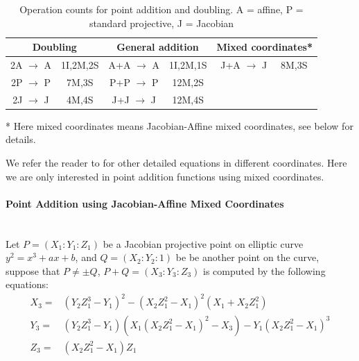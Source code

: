 \begin{table}[h]
	\centering
	\caption{Operation counts for point addition and doubling. A = affine, P = standard projective, J = Jacobian \cite{hankerson2006guide,brown2001software}}
	\label{tb:APJacobian}
	\begin{tabular}{|cc|cc|ll|}
		\hline
		\multicolumn{2}{|c|}{Doubling} & \multicolumn{2}{c|}{General addition} & \multicolumn{2}{c|}{Mixed coordinates*} \\ \hline
		2A $\rightarrow$ A         & 1I,2M,2S        & A+A $\rightarrow$ A            & 1I,2M,1S           & \multicolumn{1}{c}{J+A $\rightarrow$ J}    & 8M,3S   \\
		2P $\rightarrow$ P         & 7M,3S           & P+P $\rightarrow$ P            & 12M,2S             &                              &         \\
		2J $\rightarrow$ J         & 4M,4S           & J+J $\rightarrow$ J            & 12M,4S             &                              &         \\ \hline
	\end{tabular} \par
	\bigskip
	* Here mixed coordinates means Jacobian-Affine mixed coordinates, see below for details.
\end{table}

We refer the reader to \cite{hankerson2006guide,brown2001software} for other detailed equations in different coordinates. Here we are only interested in point addition functions using mixed coordinates. 

\paragraph{Point Addition using Jacobian-Affine Mixed Coordinates} \mbox{} \\
Let $P = (X_1:Y_1:Z_1)$ be a Jacobian projective point on elliptic curve $y^2=x^3+ax+b$, and $Q = (X_2:Y_2:1)$ be be another point on the curve, suppose that $P \neq \pm Q$, $P+Q=(X_3:Y_3:Z_3)$ is computed by the following equations:
\begin{equation} \label{eq:8m3s}
\begin{split}
X_3 = &(Y_2Z_1^3-Y_1)^2 - (X_2Z_1^2-X_1)^2(X_1+X_2Z_1^2) \\
Y_3 = &(Y_2Z_1^3-Y_1)(X_1(X_2Z_1^2-X_1)^2-X_3)-Y_1(X_2Z_1^2-X_1)^3 \\
Z_3 = &(X_2Z_1^2-X_1)Z_1 
\end{split}
\end{equation}

